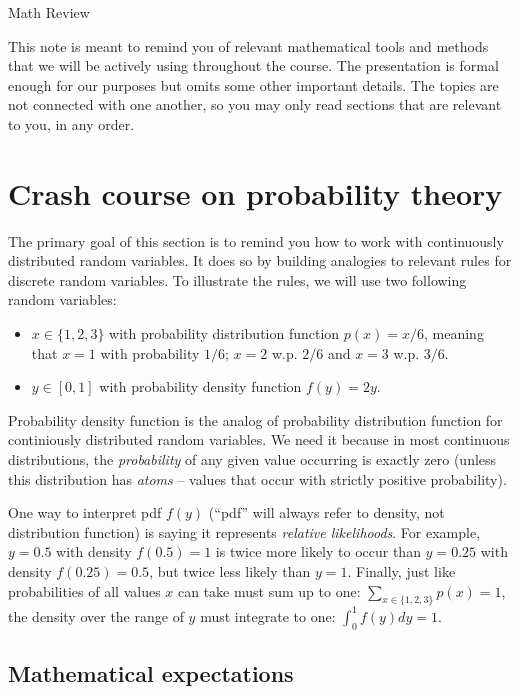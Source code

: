 \documentclass{article}
\begin{document}
\begin{center}
	{\Huge Math Review}
\end{center}
\bigskip


This note is meant to remind you of relevant mathematical tools and methods that we will be actively using throughout the course. The presentation is formal enough for our purposes but omits some other important details. The topics are not connected with one another, so you may only read sections that are relevant to you, in any order.


\section{Crash course on probability theory}

The primary goal of this section is to remind you how to work with continuously distributed random variables. It does so by building analogies to relevant rules for discrete random variables. To illustrate the rules, we will use two following random variables:
\begin{itemize}
	\item $x \in \{1,2,3\}$ with probability distribution function $p(x) = x/6$, meaning that $x=1$ with probability $1/6$; $x=2$ w.p. $2/6$ and $x=3$ w.p. $3/6$.
	\item $y \in [0,1]$ with probability density function $f(y)=2y$.
\end{itemize}
Probability density function is the analog of probability distribution function for continiously distributed random variables. We need it because in most continuous distributions, the \emph{probability} of any given value occurring is exactly zero (unless this distribution has \emph{atoms} -- values that occur with strictly positive probability). 

One way to interpret pdf $f(y)$ (``pdf'' will always refer to density, not distribution function) is saying it represents \emph{relative likelihoods}. For example, $y=0.5$ with density $f(0.5)=1$ is twice more likely to occur than $y=0.25$ with density $f(0.25)=0.5$, but twice less likely than $y=1$. Finally, just like probabilities of all values $x$ can take must sum up to one: $\sum_{x \in \{1,2,3\}} p(x) = 1$, the density over the range of $y$ must integrate to one: $\int_{0}^1 f(y) dy = 1$.


\subsection{Mathematical expectations}
\end{document}
